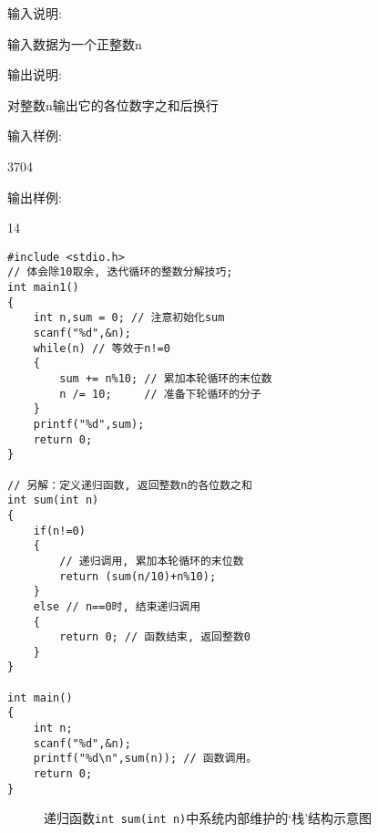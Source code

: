 输入说明:
	
输入数据为一个正整数n

输出说明:
	
对整数n输出它的各位数字之和后换行

输入样例:	

3704

输出样例:	

14
\newpage
\begin{lstlisting}
#include <stdio.h>
// 体会除10取余, 迭代循环的整数分解技巧;
int main1()
{
	int n,sum = 0; // 注意初始化sum
	scanf("%d",&n);
	while(n) // 等效于n!=0 
	{
		sum += n%10; // 累加本轮循环的末位数
		n /= 10;     // 准备下轮循环的分子
	}
	printf("%d",sum);
	return 0;	
}

// 另解：定义递归函数, 返回整数n的各位数之和 
int sum(int n)
{
	if(n!=0)
	{
	    // 递归调用, 累加本轮循环的末位数
		return (sum(n/10)+n%10); 
	}
	else // n==0时, 结束递归调用 
	{
		return 0; // 函数结束, 返回整数0
	}	
}

int main()
{
	int n;
	scanf("%d",&n);
	printf("%d\n",sum(n)); // 函数调用。 
	return 0; 
}
\end{lstlisting}

\begin{figure}[H]
	\centering
	\caption{递归函数\lstinline|int sum(int n)|中系统内部维护的`栈'结构示意图}	
\end{figure}

